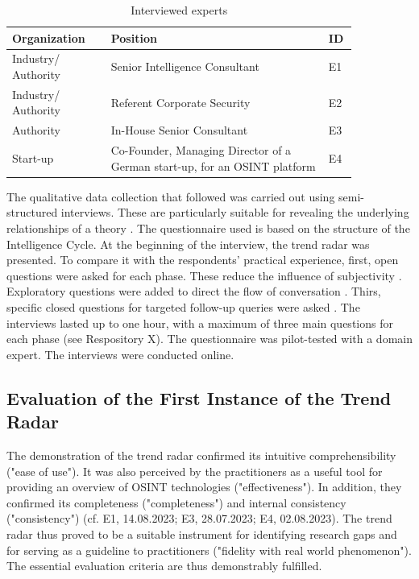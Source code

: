 \documentclass[10pt]{article}
\begin{document}
\begin{table}[htbp]
    \caption{Interviewed experts}
    \begin{tabular}{|p{0.25\linewidth}|p{0.55\linewidth}|p{0.05\linewidth}|}
        \hline
        \textbf{Organization} & \textbf{Position}                                                         & \textbf{ID} \\
        \hline
        Industry/ Authority   & Senior Intelligence Consultant                                            & E1          \\
        \hline
        Industry/ Authority   & Referent Corporate Security                                               & E2          \\
        \hline
        Authority             & In-House Senior Consultant                                                & E3          \\
        \hline
        Start-up              & Co-Founder, Managing Director of a German start-up, for an OSINT platform & E4          \\
        \hline
    \end{tabular}
    \label{tab:experts}
\end{table}

The qualitative data collection that followed was carried out using
semi-structured interviews. These are particularly suitable for
revealing the underlying relationships of a theory \cite{Bogner.2014}. The
questionnaire used is based on the structure of the Intelligence Cycle.
At the beginning of the interview, the trend radar was presented.
To compare it with the respondents' practical experience, first, open questions
were asked for each phase. These reduce the influence of
subjectivity \cite{Saunders.2012}. Exploratory questions were added to direct the flow of conversation
\cite{Saunders.2012}. Thirs, specific closed questions for targeted follow-up
queries were asked \cite{Saunders.2012}. The interviews lasted up to one hour, with a maximum of three
main questions for each phase \cite{Bogner.2014} (see Respository X). The questionnaire
was pilot-tested with a domain expert. The interviews were conducted online.

\subsection{Evaluation of the First Instance of the Trend Radar}

The demonstration of the trend radar confirmed its intuitive
comprehensibility ("ease of use"). It was also perceived by the
practitioners as a useful tool for providing an overview of OSINT
technologies ("effectiveness"). In addition, they confirmed its
completeness ("completeness") and internal consistency ("consistency")
(cf. E1, 14.08.2023; E3, 28.07.2023; E4,
02.08.2023). The trend radar thus proved to be a
suitable instrument for identifying research gaps and for serving as a guideline to practitioners
("fidelity with real world phenomenon"). The essential evaluation
criteria \cite{Sonnenberg.2012} are thus demonstrably fulfilled.
\end{document}
